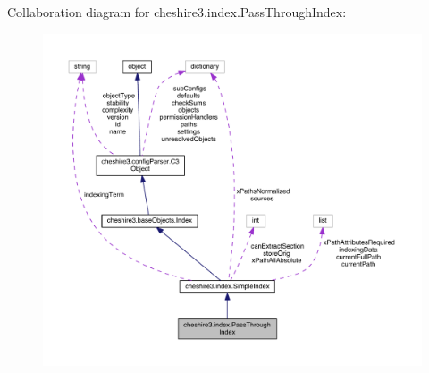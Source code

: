 Collaboration diagram for cheshire3.\-index.\-Pass\-Through\-Index\-:
\nopagebreak
\begin{figure}[H]
\begin{center}
\leavevmode
\includegraphics[width=350pt]{classcheshire3_1_1index_1_1_pass_through_index__coll__graph}
\end{center}
\end{figure}
